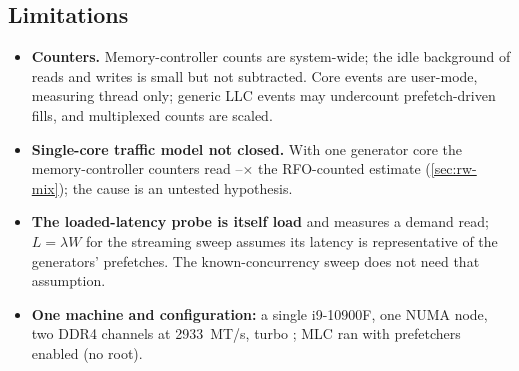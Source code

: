 \subsection{Limitations}
\begin{itemize}[nosep, leftmargin=*]
  \item \textbf{Counters.} Memory-controller counts are system-wide; the idle background of
         reads and 
        writes is small but not subtracted. Core events are user-mode, measuring thread only; generic LLC events
        may undercount prefetch-driven fills, and multiplexed counts are scaled.
  \item \textbf{Single-core traffic model not closed.} With one generator core the memory-controller
        counters read --$\times$ the RFO-counted estimate
        (\cref{sec:rw-mix}); the cause is an untested hypothesis.
  \item \textbf{The loaded-latency probe is itself load} and measures a demand read; $L=\lambda W$ for the
        streaming sweep assumes its latency is representative of the generators' prefetches. The
        known-concurrency sweep does not need that assumption.
  \item \textbf{One machine and configuration:} a single i9-10900F, one NUMA node, two DDR4 channels at
        \qty{2933}{MT/s}, turbo \sysTurbo{}; MLC ran with prefetchers enabled (no root).
\end{itemize}
